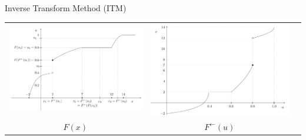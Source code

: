 \documentclass[aspectratio=169]{beamer}
\begin{document}
\begin{frame}{Inverse Transform Method (ITM)}

  \begin{tabular}{ccc}
 \includegraphics[width=0.5\linewidth]{pics/figure_inverse_fun1.png}
&
\includegraphics[width=0.45\linewidth]{pics/figure_inverse_fun2.png} \\
$F(x)$ & $F^{\leftarrow}(u)$
 \end{tabular}

\end{frame}
\end{document}

